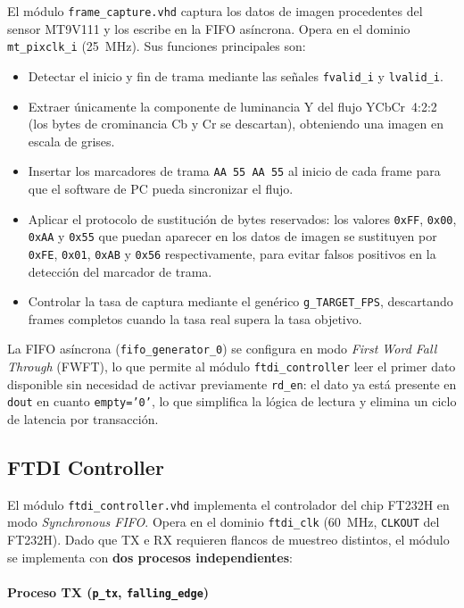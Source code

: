 \documentclass[../main.tex]{subfiles}
\begin{document}
El módulo \texttt{frame\_capture.vhd} captura los datos de imagen procedentes del sensor MT9V111 y los escribe en la FIFO asíncrona. Opera en el dominio \texttt{mt\_pixclk\_i} (25~MHz). Sus funciones principales son:

\begin{itemize}
    \item Detectar el inicio y fin de trama mediante las señales \texttt{fvalid\_i} y \texttt{lvalid\_i}.
    \item Extraer únicamente la componente de luminancia Y del flujo YCbCr~4:2:2 (los bytes de crominancia Cb y Cr se descartan), obteniendo una imagen en escala de grises.
    \item Insertar los marcadores de trama \texttt{AA 55 AA 55} al inicio de cada frame para que el software de PC pueda sincronizar el flujo.
    \item Aplicar el protocolo de sustitución de bytes reservados: los valores \texttt{0xFF}, \texttt{0x00}, \texttt{0xAA} y \texttt{0x55} que puedan aparecer en los datos de imagen se sustituyen por \texttt{0xFE}, \texttt{0x01}, \texttt{0xAB} y \texttt{0x56} respectivamente, para evitar falsos positivos en la detección del marcador de trama.
    \item Controlar la tasa de captura mediante el genérico \texttt{g\_TARGET\_FPS}, descartando frames completos cuando la tasa real supera la tasa objetivo.
\end{itemize}

La FIFO asíncrona (\texttt{fifo\_generator\_0}) se configura en modo \textit{First Word Fall Through} (FWFT), lo que permite al módulo \texttt{ftdi\_controller} leer el primer dato disponible sin necesidad de activar previamente \texttt{rd\_en}: el dato ya está presente en \texttt{dout} en cuanto \texttt{empty='0'}, lo que simplifica la lógica de lectura y elimina un ciclo de latencia por transacción.

\subsection{FTDI Controller}
\label{sec:ftdi_controller}

El módulo \texttt{ftdi\_controller.vhd} implementa el controlador del chip FT232H en modo \textit{Synchronous FIFO}. Opera en el dominio \texttt{ftdi\_clk} (60~MHz, \texttt{CLKOUT} del FT232H). Dado que TX e RX requieren flancos de muestreo distintos, el módulo se implementa con \textbf{dos procesos independientes}:

\paragraph{Proceso TX (\texttt{p\_tx}, \texttt{falling\_edge})}
\end{document}
